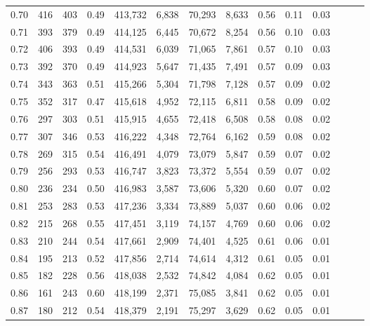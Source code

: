 \begin{tabular}{rrrrrrrrrrrrrr}
0.70 &     416 &    403 &  0.49 &  413,732 &    6,838 &  70,293 &   8,633 &  0.56 &  0.11 &      0.03 \\
0.71 &     393 &    379 &  0.49 &  414,125 &    6,445 &  70,672 &   8,254 &  0.56 &  0.10 &      0.03 \\
0.72 &     406 &    393 &  0.49 &  414,531 &    6,039 &  71,065 &   7,861 &  0.57 &  0.10 &      0.03 \\
0.73 &     392 &    370 &  0.49 &  414,923 &    5,647 &  71,435 &   7,491 &  0.57 &  0.09 &      0.03 \\
0.74 &     343 &    363 &  0.51 &  415,266 &    5,304 &  71,798 &   7,128 &  0.57 &  0.09 &      0.02 \\
0.75 &     352 &    317 &  0.47 &  415,618 &    4,952 &  72,115 &   6,811 &  0.58 &  0.09 &      0.02 \\
0.76 &     297 &    303 &  0.51 &  415,915 &    4,655 &  72,418 &   6,508 &  0.58 &  0.08 &      0.02 \\
0.77 &     307 &    346 &  0.53 &  416,222 &    4,348 &  72,764 &   6,162 &  0.59 &  0.08 &      0.02 \\
0.78 &     269 &    315 &  0.54 &  416,491 &    4,079 &  73,079 &   5,847 &  0.59 &  0.07 &      0.02 \\
0.79 &     256 &    293 &  0.53 &  416,747 &    3,823 &  73,372 &   5,554 &  0.59 &  0.07 &      0.02 \\
0.80 &     236 &    234 &  0.50 &  416,983 &    3,587 &  73,606 &   5,320 &  0.60 &  0.07 &      0.02 \\
0.81 &     253 &    283 &  0.53 &  417,236 &    3,334 &  73,889 &   5,037 &  0.60 &  0.06 &      0.02 \\
0.82 &     215 &    268 &  0.55 &  417,451 &    3,119 &  74,157 &   4,769 &  0.60 &  0.06 &      0.02 \\
0.83 &     210 &    244 &  0.54 &  417,661 &    2,909 &  74,401 &   4,525 &  0.61 &  0.06 &      0.01 \\
0.84 &     195 &    213 &  0.52 &  417,856 &    2,714 &  74,614 &   4,312 &  0.61 &  0.05 &      0.01 \\
0.85 &     182 &    228 &  0.56 &  418,038 &    2,532 &  74,842 &   4,084 &  0.62 &  0.05 &      0.01 \\
0.86 &     161 &    243 &  0.60 &  418,199 &    2,371 &  75,085 &   3,841 &  0.62 &  0.05 &      0.01 \\
0.87 &     180 &    212 &  0.54 &  418,379 &    2,191 &  75,297 &   3,629 &  0.62 &  0.05 &      0.01 \\

\end{tabular}
